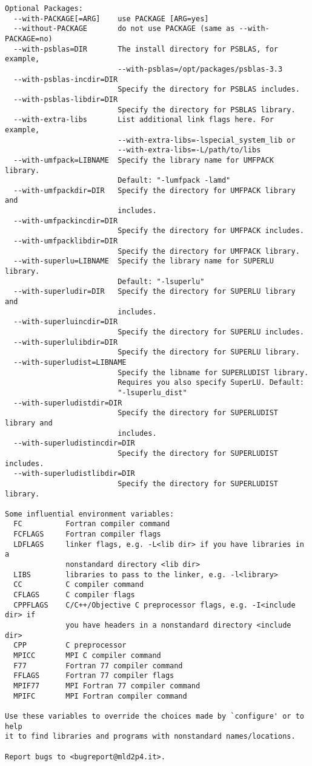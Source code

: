 \begin{verbatim}
Optional Packages:
  --with-PACKAGE[=ARG]    use PACKAGE [ARG=yes]
  --without-PACKAGE       do not use PACKAGE (same as --with-PACKAGE=no)
  --with-psblas=DIR       The install directory for PSBLAS, for example,
                          --with-psblas=/opt/packages/psblas-3.3
  --with-psblas-incdir=DIR
                          Specify the directory for PSBLAS includes.
  --with-psblas-libdir=DIR
                          Specify the directory for PSBLAS library.
  --with-extra-libs       List additional link flags here. For example,
                          --with-extra-libs=-lspecial_system_lib or
                          --with-extra-libs=-L/path/to/libs
  --with-umfpack=LIBNAME  Specify the library name for UMFPACK library.
                          Default: "-lumfpack -lamd"
  --with-umfpackdir=DIR   Specify the directory for UMFPACK library and
                          includes.
  --with-umfpackincdir=DIR
                          Specify the directory for UMFPACK includes.
  --with-umfpacklibdir=DIR
                          Specify the directory for UMFPACK library.
  --with-superlu=LIBNAME  Specify the library name for SUPERLU library.
                          Default: "-lsuperlu"
  --with-superludir=DIR   Specify the directory for SUPERLU library and
                          includes.
  --with-superluincdir=DIR
                          Specify the directory for SUPERLU includes.
  --with-superlulibdir=DIR
                          Specify the directory for SUPERLU library.
  --with-superludist=LIBNAME
                          Specify the libname for SUPERLUDIST library.
                          Requires you also specify SuperLU. Default:
                          "-lsuperlu_dist"
  --with-superludistdir=DIR
                          Specify the directory for SUPERLUDIST library and
                          includes.
  --with-superludistincdir=DIR
                          Specify the directory for SUPERLUDIST includes.
  --with-superludistlibdir=DIR
                          Specify the directory for SUPERLUDIST library.

Some influential environment variables:
  FC          Fortran compiler command
  FCFLAGS     Fortran compiler flags
  LDFLAGS     linker flags, e.g. -L<lib dir> if you have libraries in a
              nonstandard directory <lib dir>
  LIBS        libraries to pass to the linker, e.g. -l<library>
  CC          C compiler command
  CFLAGS      C compiler flags
  CPPFLAGS    C/C++/Objective C preprocessor flags, e.g. -I<include dir> if
              you have headers in a nonstandard directory <include dir>
  CPP         C preprocessor
  MPICC       MPI C compiler command
  F77         Fortran 77 compiler command
  FFLAGS      Fortran 77 compiler flags
  MPIF77      MPI Fortran 77 compiler command
  MPIFC       MPI Fortran compiler command

Use these variables to override the choices made by `configure' or to help
it to find libraries and programs with nonstandard names/locations.

Report bugs to <bugreport@mld2p4.it>.
\end{verbatim}
